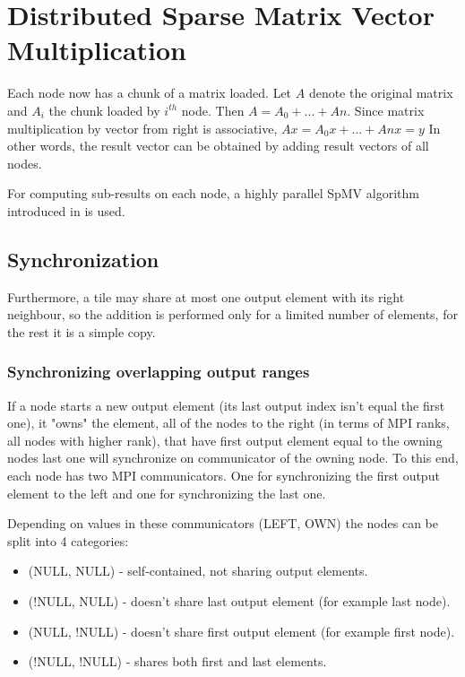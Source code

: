 \documentclass[thesis=M,english]{FITthesis}[2019/12/23]
\begin{document}
\chapter{Distributed Sparse Matrix Vector Multiplication}

Each node now has a chunk of a matrix loaded. Let $A$ denote the original matrix
and $A_{i}$ the chunk loaded by $i^{th}$ node. Then $A = A_{0} + ... + A{n}$. Since
matrix multiplication by vector from right is associative, $Ax = A_{0}x + ... + A{n}x = y$
In other words, the result vector can be obtained by adding result vectors of all nodes.

For computing sub-results on each node, a highly parallel SpMV algorithm introduced in
\cite{liu2015csr5} is used.

\section{Synchronization}

Furthermore, a tile may share at most one output element with its right neighbour, so
the addition is performed only for a limited number of elements, for the rest it is
a simple copy.

\subsection{Synchronizing overlapping output ranges}

If a node starts a new output element (its last output index isn't equal the first one),
it "owns" the element, all of the nodes to the right (in terms of MPI ranks, all nodes
with higher rank), that have first output element equal to the owning nodes last one
will synchronize on communicator of the owning node. To this end, each node has two
MPI communicators. One for synchronizing the first output element to the left and one
for synchronizing the last one.

Depending on values in these communicators (LEFT, OWN) the nodes can be split into 4 categories:

\begin{itemize}
    \item (NULL, NULL) - self-contained, not sharing output elements.
    \item (!NULL, NULL) - doesn't share last output element (for example last node).
    \item (NULL, !NULL) - doesn't share first output element (for example first node).
    \item (!NULL, !NULL) - shares both first and last elements.
\end{itemize}
\end{document}
